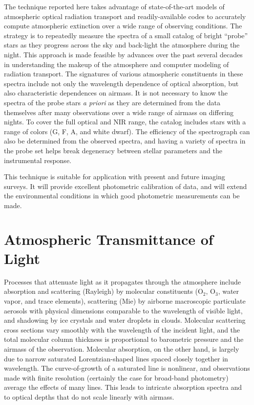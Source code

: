 \documentclass[manuscript]{aastex}
\begin{document}
The technique reported here takes advantage of state-of-the-art models of atmospheric optical radiation transport and
readily-available codes to accurately compute atmospheric extinction over a wide range of observing conditions.
The strategy is to repeatedly measure the spectra of a small catalog of bright ``probe'' stars
as they progress across the sky and back-light the atmosphere during the night.
This approach is made feasible by advances over the past several decades in understanding the makeup of the atmosphere
and computer modeling of radiation transport.
The signatures of various atmospheric constituents in these spectra include not only the wavelength dependence of optical absorption,
but also characteristic dependences on airmass. 
It is not necessary to know the spectra of the probe stars {\it a priori} as they are determined from the data themselves after many observations
over a wide range of airmass on differing nights.
To cover the full optical and NIR range, the catalog includes stars with a range of colors (G, F, A, and white dwarf). 
The efficiency of the spectrograph can also be determined from the observed spectra,
and having a variety of spectra in the probe set helps break degeneracy between stellar parameters and the instrumental response.

This technique is suitable for application with present and future imaging surveys.
It will provide excellent photometric calibration of data, 
and will extend the environmental conditions in which good photometric measurements can be made.


\section{Atmospheric Transmittance of Light}

Processes that attenuate light as it propagates through the atmosphere include absorption and scattering (Rayleigh)
by molecular constituents (O$_{2}$, O$_{3}$, water vapor, and trace elements),
scattering (Mie) by airborne macroscopic particulate aerosols with physical dimensions comparable to the wavelength of visible light,
and shadowing by ice crystals and water droplets in clouds.
Molecular scattering cross sections vary smoothly with the wavelength of the incident light,
and the total molecular column thickness is proportional to barometric pressure and the airmass of the observation.
Molecular absorption, on the other hand, is largely due to narrow saturated Lorentzian-shaped lines spaced closely together in wavelength.
The curve-of-growth of a saturated line is nonlinear, 
and observations made with finite resolution (certainly the case for broad-band photometry) average the effects of many lines. 
This leads to intricate absorption spectra and to optical depths that do not scale linearly with airmass.
\end{document}
